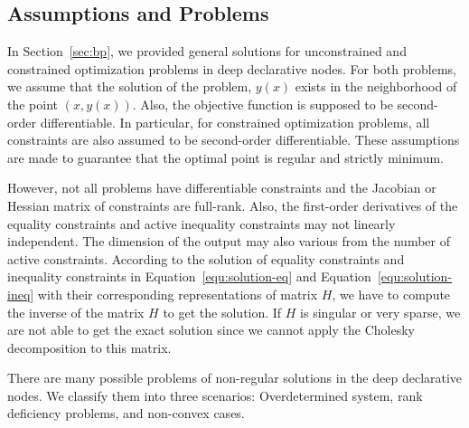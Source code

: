 \subsection{Assumptions and Problems}
In Section~\ref{sec:bp}, we provided general solutions for unconstrained and constrained optimization problems in deep declarative nodes. For both problems, we assume that the solution of the problem, $y(x)$ exists in the neighborhood of the point $(x, y(x))$. Also, the objective function is supposed to be second-order differentiable. In particular, for constrained optimization problems, all constraints are also assumed to be second-order differentiable. These assumptions are made to guarantee that the optimal point is regular and strictly minimum. 
\par However, not all problems have differentiable constraints and the Jacobian or Hessian matrix of constraints are full-rank. Also, the first-order derivatives of the equality constraints and active inequality constraints may not linearly independent. The dimension of the output may also various from the number of active constraints. According to the solution of equality constraints and inequality constraints in Equation~\ref{equ:solution-eq} and Equation~\ref{equ:solution-ineq} with their corresponding representations of matrix $H$, we have to compute the inverse of the matrix $H$ to get the solution. If $H$ is singular or very sparse, we are not able to get the exact solution since we cannot apply the Cholesky decomposition to this matrix. 
\par There are many possible problems of non-regular solutions in the deep declarative nodes. We classify them into three scenarios: Overdetermined system, rank deficiency problems, and non-convex cases. 

